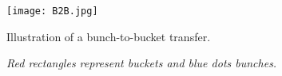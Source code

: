 %
%
%
\begin{figure}[H]
   \centering   
   \texttt{[image: B2B.jpg]}
   \caption{Illustration of a bunch-to-bucket transfer.}
	\caption*{\textsl{\small{Red rectangles represent buckets and blue dots bunches.}}}

   \label{B2B}
\end{figure}

